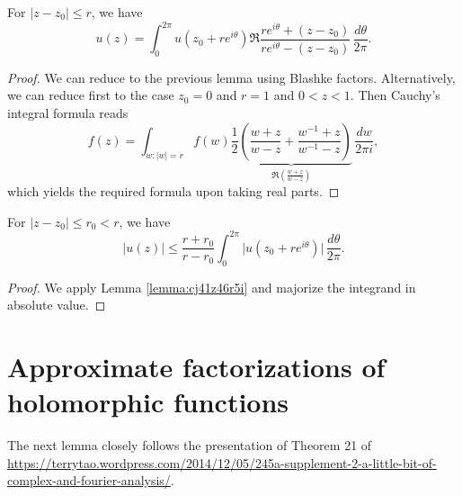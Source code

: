 \documentclass[reqno]{amsart} 
\begin{document}
\begin{lemma}\label{lemma:cj41z46r5i}
  For $\lvert z - z_0 \rvert \leq r$, we have
  \begin{equation*}
    u(z) = \int_0^{2 \pi } u (z_0 + r e^{i \theta }) \Re \frac{r e^{i \theta } + (z - z_0 )}{r e^{i \theta } - (z - z_0 )}
    \, \frac{d \theta }{2 \pi }.
  \end{equation*}
\end{lemma}
\begin{proof}
  We can reduce to the previous lemma using Blashke factors.  Alternatively, we can reduce first to the case $z_0 = 0$ and $r = 1$ and $0 < z < 1$.  Then Cauchy's integral formula reads
  \begin{equation*}
    f(z) =
    \int_{w : \lvert w \rvert = r}
    f(w)
    \underbrace
{
\frac{1}{2} \left(
      \frac{w + z}{w - z}
      + 
      \frac{w^{-1}  + z}{w^{-1}  - z}
    \right)
}_{
\Re \left( \frac{w + z}{w - z} \right)
}
\, \frac{d w}{2 \pi i},
  \end{equation*}
  which yields the required formula upon taking real parts.
\end{proof}

\begin{lemma}\label{lemma:cj41z46zau}
  For $\lvert z - z_0 \rvert \leq r_0 < r$, we have
  \begin{equation*}
    \lvert u(z) \rvert \leq \frac{r + r_0}{r - r_0}
\int_{0 }^{2 \pi } \lvert u (z_0 + r e^{i \theta }) \rvert \, \frac{d \theta }{2 \pi}.    
  \end{equation*}
\end{lemma}
\begin{proof}
We apply Lemma \ref{lemma:cj41z46r5i} and majorize the integrand in absolute value.
\end{proof}

\section{Approximate factorizations of holomorphic functions}\label{sec:cj41z5fwla}
The next lemma closely follows the presentation of Theorem 21 of \href{these notes}{https://terrytao.wordpress.com/2014/12/05/245a-supplement-2-a-little-bit-of-complex-and-fourier-analysis/}.
\end{document}
